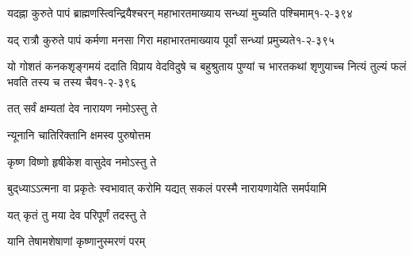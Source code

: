 \annotwolineshloka
{यदह्ना कुरुते पापं ब्राह्मणस्त्विन्द्रियैश्चरन्}
{महाभारतमाख्याय सन्ध्यां मुच्यति पश्चिमाम्}{१-२-३९४}

\annotwolineshloka
{यद् रात्रौ कुरुते पापं कर्मणा मनसा गिरा}
{महाभारतमाख्याय पूर्वां सन्ध्यां प्रमुच्यते}{१-२-३९५}

\annofourlineindentedshloka
{यो गोशतं कनकशृङ्गमयं ददाति}
{विप्राय वेदविदुषे च बहुश्रुताय}
{पुण्यां च भारतकथां शृणुयाच्च नित्यं}
{तुल्यं फलं भवति तस्य च तस्य चैव}{१-२-३९६}

{तत् सर्वं क्षम्यतां देव नारायण नमोऽस्तु ते}

{न्यूनानि चातिरिक्तानि क्षमस्व पुरुषोत्तम}

{कृष्ण विष्णो हृषीकेश वासुदेव नमोऽस्तु ते}

{बुद्‌ध्याऽऽत्मना वा प्रकृतेः स्वभावात्}
{करोमि यद्यत् सकलं परस्मै}
{नारायणायेति समर्पयामि}

{यत् कृतं तु मया देव परिपूर्णं तदस्तु ते}

{यानि तेषामशेषाणां कृष्णानुस्मरणं परम्}

\hyperref[sec:start]{\closesection}
